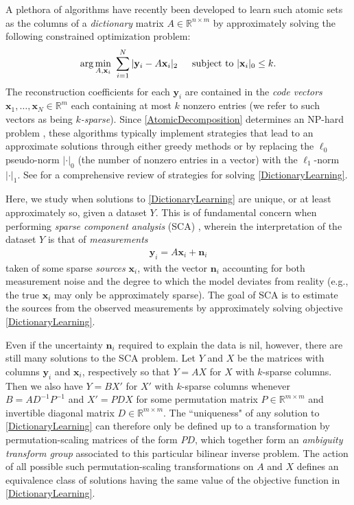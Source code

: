 \documentclass[journal, onecolumn]{IEEEtran}
\begin{document}
A plethora of algorithms \cite{?} have recently been developed to learn such atomic sets as the columns of a \emph{dictionary} matrix $A \in \mathbb{R}^{n \times m}$ by approximately solving the following constrained optimization problem:
\begin{align}\label{DictionaryLearning}
\arg \min_{A, \mathbf{x}_i} \  \sum_{i=1}^N |\mathbf{y}_i - A\mathbf{x}_i|_2 \indent \text{subject to } |\mathbf{x}_i|_0 \leq k.
\end{align}
%
The reconstruction coefficients for each $\mathbf{y}_i$ are contained in the \emph{code vectors} $\mathbf{x}_1, \ldots, \mathbf{x}_N \in \mathbb{R}^m$ each containing at most $k$ nonzero entries (we refer to such vectors as being \emph{$k$-sparse}). Since \eqref{AtomicDecomposition} determines an NP-hard problem \cite{Tillmann15}, these algorithms typically implement strategies that lead to an approximate solutions through either greedy methods or by replacing the $\ell_0$ pseudo-norm $|\cdot|_0$ (the number of nonzero entries in a vector) with the $\ell_1$-norm $|\cdot|_1$. See \cite{Zhang15} for a comprehensive review of strategies for solving \eqref{DictionaryLearning}. 

Here, we study when solutions to \eqref{DictionaryLearning} are unique, or at least approximately so, given a dataset $Y$. This is of fundamental concern when performing \emph{sparse component analysis} (SCA) \cite{Georgiev05}, wherein the interpretation of the dataset $Y$ is that of \emph{measurements}
\begin{align}\label{LinearModel}
\mathbf{y}_i = A\mathbf{x}_i + \mathbf{n}_i
\end{align}
%
taken of some sparse \emph{sources} $\mathbf{x}_i$, with the vector $\mathbf{n}_i$ accounting for both measurement noise and the degree to which the model deviates from reality (e.g., the true $\mathbf{x}_i$ may only be approximately sparse). The goal of SCA is to estimate the sources from the observed measurements by approximately solving objective \eqref{DictionaryLearning}.

Even if the uncertainty $\mathbf{n}_i$ required to explain the data is nil, however, there are still many solutions to the SCA problem. Let $Y$ and $X$ be the matrices with columns $\mathbf{y}_i$ and $\mathbf{x}_i$, respectively so that $Y = AX$ for $X$ with $k$-sparse columns. Then we also have $Y = BX'$ for $X'$ with $k$-sparse columns whenever $B = AD^{-1}P^{-1}$ and $X' = PDX$ for some permutation matrix $P \in \mathbb{R}^{m \times m}$ and invertible diagonal matrix $D \in \mathbb{R}^{m \times m}$. The ``uniqueness" of any solution to \eqref{DictionaryLearning} can therefore only be defined up to a transformation by permutation-scaling matrices of the form $PD$, which together form an \emph{ambiguity transform group} \cite{?} associated to this particular bilinear inverse problem. The action of all possible such permutation-scaling transformations on $A$ and $X$ defines an equivalence class of solutions having the same value of the objective function in \eqref{DictionaryLearning}. 
\end{document}
